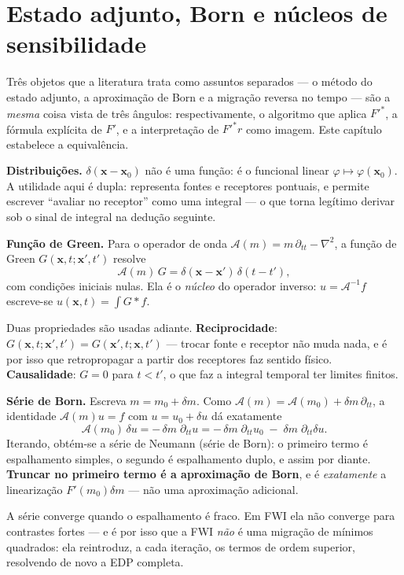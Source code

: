 \documentclass[11pt,a4paper,oneside]{report}
\begin{document}
\chapter{Estado adjunto, Born e n\'ucleos de sensibilidade}
\label{cap:adjunto}

\begin{ideia}
Tr\^es objetos que a literatura trata como assuntos separados --- o m\'etodo
do estado adjunto, a aproxima\c{c}\~ao de Born e a migra\c{c}\~ao reversa no
tempo --- s\~ao a \emph{mesma} coisa vista de tr\^es \^angulos:
respectivamente, o algoritmo que aplica $F'^{*}$, a f\'ormula expl\'icita de
$F'$, e a interpreta\c{c}\~ao de $F'^{*}r$ como imagem. Este cap\'itulo
estabelece a equival\^encia.
\end{ideia}

\begin{matematica}
\textbf{Distribui\c{c}\~oes.} $\delta(\mathbf{x}-\mathbf{x}_0)$ n\~ao \'e uma
fun\c{c}\~ao: \'e o funcional linear $\varphi \mapsto \varphi(\mathbf{x}_0)$. A
utilidade aqui \'e dupla: representa fontes e receptores pontuais, e permite
escrever ``avaliar no receptor'' como uma integral --- o que torna leg\'itimo
derivar sob o sinal de integral na dedu\c{c}\~ao seguinte.

\textbf{Fun\c{c}\~ao de Green.} Para o operador de onda
$\mathcal{A}(m) = m\,\partial_{tt} - \nabla^{2}$, a fun\c{c}\~ao de Green
$G(\mathbf{x},t;\mathbf{x}',t')$ resolve
\[
\mathcal{A}(m)\,G = \delta(\mathbf{x}-\mathbf{x}')\,\delta(t-t'),
\]
com condi\c{c}\~oes iniciais nulas. Ela \'e o \emph{n\'ucleo} do operador
inverso: $u = \mathcal{A}^{-1}f$ escreve-se
$u(\mathbf{x},t) = \int G * f$.

Duas propriedades s\~ao usadas adiante. \textbf{Reciprocidade}:
$G(\mathbf{x},t;\mathbf{x}',t') = G(\mathbf{x}',t;\mathbf{x},t')$ --- trocar
fonte e receptor n\~ao muda nada, e \'e por isso que retropropagar a partir dos
receptores faz sentido f\'isico. \textbf{Causalidade}: $G = 0$ para $t<t'$, o
que faz a integral temporal ter limites finitos.

\textbf{S\'erie de Born.} Escreva $m = m_0 + \delta m$. Como
$\mathcal{A}(m) = \mathcal{A}(m_0) + \delta m\,\partial_{tt}$, a identidade
$\mathcal{A}(m)u = f$ com $u = u_0 + \delta u$ d\'a exatamente
\[
\mathcal{A}(m_0)\,\delta u = -\,\delta m\;\partial_{tt} u
 = -\,\delta m\;\partial_{tt} u_0
   \;-\;\delta m\;\partial_{tt}\delta u .
\]
Iterando, obt\'em-se a s\'erie de Neumann (s\'erie de Born):
o primeiro termo \'e espalhamento simples, o segundo \'e espalhamento duplo, e
assim por diante. \textbf{Truncar no primeiro termo \'e a aproxima\c{c}\~ao de
Born}, e \'e \emph{exatamente} a lineariza\c{c}\~ao $F'(m_0)\delta m$ ---
n\~ao uma aproxima\c{c}\~ao adicional.

A s\'erie converge quando o espalhamento \'e fraco. Em FWI ela n\~ao converge
para contrastes fortes --- e \'e por isso que a FWI \emph{n\~ao} \'e uma
migra\c{c}\~ao de m\'inimos quadrados: ela reintroduz, a cada itera\c{c}\~ao,
os termos de ordem superior, resolvendo de novo a EDP completa.
\end{matematica}
\end{document}
